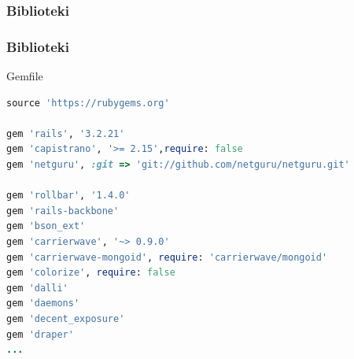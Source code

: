 \begin{frame}[fragile]
\frametitle{Biblioteki}
\end{frame}


\begin{frame}[fragile]
\frametitle{Biblioteki}
\begin{block}{Gemfile}
\begin{lstlisting}[language=Ruby,basicstyle=\tiny\ttfamily]
source 'https://rubygems.org'

gem 'rails', '3.2.21'
gem 'capistrano', '>= 2.15',require: false
gem 'netguru', :git => 'git://github.com/netguru/netguru.git'

gem 'rollbar', '1.4.0'
gem 'rails-backbone'
gem 'bson_ext'
gem 'carrierwave', '~> 0.9.0'
gem 'carrierwave-mongoid', require: 'carrierwave/mongoid'
gem 'colorize', require: false
gem 'dalli'
gem 'daemons'
gem 'decent_exposure'
gem 'draper'
...
\end{lstlisting}
\end{block}
\end{frame}

